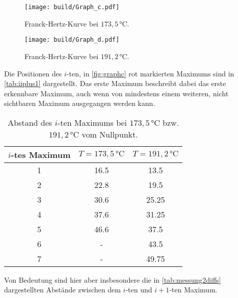 \begin{figure}[H]
    \centering
    \texttt{[image: build/Graph\_c.pdf]}
    \caption{Franck-Hertz-Kurve bei $173,5 \,\unit{\celsius}$.}
    \label{fig:graphc}
\end{figure}

\begin{figure}[H]
  \centering
  \texttt{[image: build/Graph\_d.pdf]}
  \caption{Franck-Hertz-Kurve bei $191,2 \,\unit{\celsius}$.}
  \label{fig:graphd}
\end{figure}

Die Positionen des $i$-ten, in \autoref{fig:graphc} rot markierten Maximums sind in \autoref{tab:iiplus1} dargestellt.
Das erste Maximum beschreibt dabei das erste erkennbare Maximum, auch wenn von mindestens einem weiteren, nicht sichtbaren Maximum ausgegangen werden kann.

\begin{table}[H]
    \centering
    \caption{Abstand des $i$-ten Maximums bei $173,5 \,\unit{\celsius}$ bzw. $191,2 \,\unit{\celsius}$ vom Nullpunkt.}
    \label{tab:iiplus1}
    \begin{tabular}{S[table-format = 1.1] S[table-format = 2.1] S[table-format = 2.2]}
      \toprule
      {$i$-tes Maximum} & {$T = 173,5 \,\unit{\celsius}$} & {$T = 191,2 \,\unit{\celsius}$}\\
      \midrule
        {1}               &           {16.5}           &           {13.5}            \\
        {2}               &           {22.8}           &           {19.5}            \\
        {3}               &           {30.6}           &           {25.25}           \\
        {4}               &           {37.6}           &           {31.25}           \\
        {5}               &           {46.6}           &           {37.5}            \\
        {6}               &           {-}              &           {43.5}           \\
        {7}               &           {-}              &           {49.75}          \\
      \bottomrule
    \end{tabular}
\end{table}

Von Bedeutung sind hier aber insbesondere die in \autoref{tab:messung2diffs} dargestellten Abstände zwischen dem $i$-ten und $i + 1$-ten Maximum.


